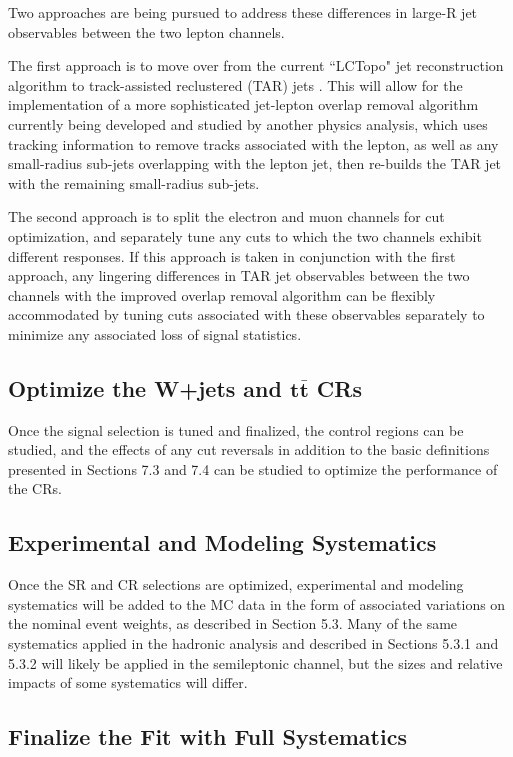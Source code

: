 \documentclass[12pt]{article}
\begin{document}
Two approaches are being pursued to address these differences in large-R jet observables between the two lepton channels. 

The first approach is to move over from the current ``LCTopo" jet reconstruction algorithm to track-assisted reclustered (TAR) jets \cite{TAR_jets}. This will allow for the implementation of a more sophisticated jet-lepton overlap removal algorithm currently being developed and studied by another physics analysis, which uses tracking information to remove tracks associated with the lepton, as well as any small-radius sub-jets overlapping with the lepton jet, then re-builds the TAR jet with the remaining small-radius sub-jets. 

The second approach is to split the electron and muon channels for cut optimization, and separately tune any cuts to which the two channels exhibit different responses. If this approach is taken in conjunction with the first approach, any lingering differences in TAR jet observables between the two channels with the improved overlap removal algorithm can be flexibly accommodated by tuning cuts associated with these observables separately to minimize any associated loss of signal statistics. 

\subsection{Optimize the W+jets and $\bm{t\bar{t}}$ CRs}

Once the signal selection is tuned and finalized, the control regions can be studied, and the effects of any cut reversals in addition to the basic definitions presented in Sections 7.3 and 7.4 can be studied to optimize the performance of the CRs. 

\subsection{Experimental and Modeling Systematics}

Once the SR and CR selections are optimized, experimental and modeling systematics will be added to the MC data in the form of associated variations on the nominal event weights, as described in Section 5.3. Many of the same systematics applied in the hadronic analysis and described in Sections 5.3.1 and 5.3.2 will likely be applied in the semileptonic channel, but the sizes and relative impacts of some systematics will differ. 

\subsection{Finalize the Fit with Full Systematics}
\end{document}
